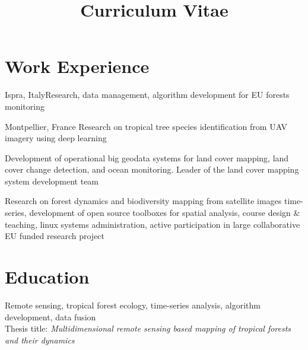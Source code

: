 \documentclass[11pt,a4paper,sans]{moderncv} %
\title{Curriculum Vitae}
\begin{document}
\makecvtitle %



\section{Work Experience}


{Ispra, Italy}{}{Research, data management, algorithm development for EU forests monitoring}


{Montpellier, France}
{}{Research on tropical tree species identification from UAV imagery using deep learning}



{Development of operational big geodata systems for land cover mapping, land cover change detection, and ocean monitoring. Leader of the land cover mapping system development team}

{Research on forest dynamics and biodiversity mapping from satellite images time-series, development of open source toolboxes for spatial analysis, course design \& teaching, linux systems administration, active participation in large collaborative EU funded research project}



\section{Education}


{Remote sensing, tropical forest ecology, time-series analysis, algorithm development, data fusion \\
Thesis title: \emph{Multidimensional remote sensing based mapping of tropical forests and their dynamics}\\}  %
\end{document}
